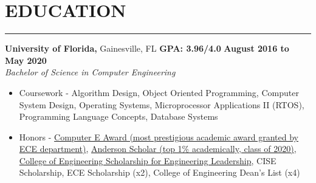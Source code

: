 \section*{EDUCATION}

\hrule \relax
\sectionheaderspace

\noindent \textbf{University of Florida,} Gainesville, FL
\hfill\textbf{GPA: 3.96/4.0}
\hfill\textbf{August 2016 to May 2020}\\
\textit{Bachelor of Science in Computer Engineering}
\begin{itemize}[noitemsep,nolistsep, label = {-}]
	\item  Coursework - 
									Algorithm Design,
									Object Oriented Programming,
									Computer System Design,
									Operating Systems,
									Microprocessor Applications II (RTOS),
									Programming Language Concepts,
									Database Systems
	\item  Honors - 
									\href{https://www.ece.ufl.edu/people/student-awards/}
											{Computer E Award (most prestigious academic award granted by ECE department)},
									\href{https://sites.clas.ufl.edu/clas-main/undergraduate/anderson-scholars/anderson-scholars-listing/}
											{Anderson Scholar (top 1\% academically, class of 2020)},
									\href{https://www.eng.ufl.edu/leadership/students/scholarships/thomas-o-hunter-leadership/}
											{College of Engineering Scholarship for Engineering Leadership},
									CISE Scholarship,
									ECE Scholarship (x2),
									College of Engineering Dean\rq s List (x4)
\end{itemize}
\subsectionspace